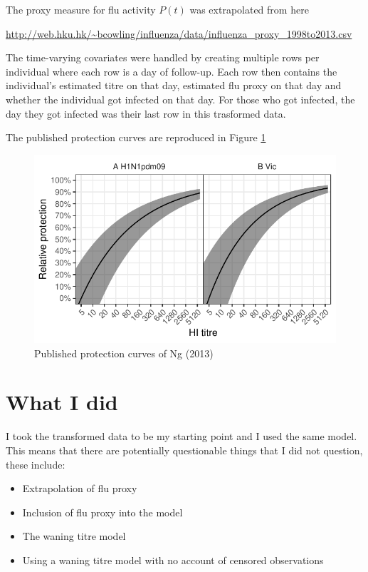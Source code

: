 \documentclass[]{article}
\begin{document}
The proxy measure for flu activity \(P(t)\) was extrapolated from here

\url{http://web.hku.hk/~bcowling/influenza/data/influenza_proxy_1998to2013.csv}

The time-varying covariates were handled by creating multiple rows per individual where each row is a day of follow-up. Each row then contains the individual's estimated titre on that day, estimated flu proxy on that day and whether the individual got infected on that day. For those who got infected, the day they got infected was their last row in this trasformed data.

The published protection curves are reproduced in Figure \ref{fig:ogcurves}

\begin{figure}
\centering
\includegraphics{../fit-cox-plot/sophia-og.pdf}
\caption{\label{fig:ogcurves}Published protection curves of Ng (2013)}
\end{figure}

\hypertarget{what-i-did}{%
\section{What I did}\label{what-i-did}}

I took the transformed data to be my starting point and I used the same model. This means that there are potentially questionable things that I did not question, these include:

\begin{itemize}
\item
  Extrapolation of flu proxy
\item
  Inclusion of flu proxy into the model
\item
  The waning titre model
\item
  Using a waning titre model with no account of censored observations
\end{itemize}
\end{document}
